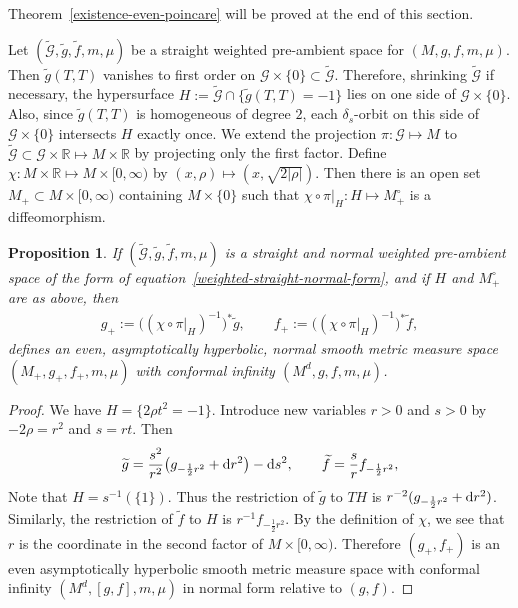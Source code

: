 \documentclass[10pt,a4paper]{amsart}
\newcommand{\mG}{\mathcal{G}}
\numberwithin{equation}{section}
\newtheorem{Proposition}[Theorem]{Proposition}
 { \theoremstyle{definition}
\newtheorem{Definition}[Theorem]{Definition}
\newtheorem{Note}[Theorem]{Note}
\newtheorem{Example}[Theorem]{Example}
\newtheorem{Remark}[Theorem]{Remark} }
\begin{document}
Theorem~\ref{existence-even-poincare} will be proved at the end of this section.

Let $(\widetilde{\mG},\widetilde{g},\widetilde{f},m,\mu)$ be a straight weighted pre-ambient space for $(M,g,f,m,\mu)$. Then $\widetilde{g}(T,T)$ vanishes to first order on $\mG\times \{0\}\subset \widetilde{\mG}$. Therefore, shrinking $\widetilde{\mG}$ if necessary, the hypersurface $H:=\widetilde{\mG}\cap \{\widetilde{g}(T,T)=-1\}$ lies on one side of $\mG\times \{0\}$. Also, since $\widetilde{g}(T,T)$ is homogeneous of degree $2$, each $\delta_s$-orbit on this side of $\mathcal{G}\times \{0\}$ intersects $H$ exactly once. We extend the projection $\pi\colon \mG\mapsto M$ to $\widetilde{\mG}\subset \mG\times \mathbb{R}\mapsto M\times \mathbb{R}$ by projecting only the first factor. Define $\chi\colon M\times \mathbb{R}\mapsto M\times [0,\infty)$ by $(x,\rho)\mapsto (x,\sqrt{2|\rho|})$. Then there is an open set $M_+\subset M\times [0,\infty)$ containing $M\times \{0\}$ such that $\chi\circ \pi|_{H}\colon H\mapsto M_+^{\circ}$ is a diffeomorphism.

\begin{Proposition}
\label{straight-poincare-existence}
If $(\widetilde{\mathcal{G}},\widetilde{g},\widetilde{f},m,\mu)$ is a straight and normal weighted pre-ambient space of the form of equation~\eqref{weighted-straight-normal-form}, and if $H$ and $M_+^{\circ}$ are as above, then
\begin{gather*}
g_+:= \big((\chi\circ \pi|_{H})^{-1}\big)^* \widetilde{g},\qquad
f_+:= \big((\chi\circ \pi|_{H})^{-1}\big)^* \widetilde{f},
\end{gather*}
defines an even, asymptotically hyperbolic, normal smooth metric measure space $(M_+,g_+,f_+,\allowbreak m,\mu)$ with conformal infinity $(M^d,g,f,m,\mu)$.
\end{Proposition}

\begin{proof}
We have $H=\{2\rho t^2=-1\}$. Introduce new variables $r>0$ and $s>0$ by $-2\rho=r^2$ and $s=rt$. Then
\begin{gather*}
\widetilde{g}= \frac{s^2}{r^2}\big(g_{-\frac{1}{2}r^2}+{\rm d}r^2\big)-{\rm d}s^2,
\qquad
\widetilde{f}= \frac{s}{r}f_{-\frac{1}{2}r^2},
\end{gather*}
Note that $H=s^{-1}(\{1\})$. Thus the restriction of $\widetilde{g}$ to $TH$ is $r^{-2}(g_{-\frac{1}{2}r^2}+{\rm d}r^2)$. Similarly, the restriction of $\widetilde{f}$ to $H$ is $r^{-1}f_{-\frac{1}{2}r^2}$. By the definition of $\chi$, we see that $r$ is the coordinate in the second factor of $M\times [0,\infty)$. Therefore $(g_+,f_+)$ is an even asymptotically hyperbolic smooth metric measure space with conformal infinity $(M^d,[g,f],m,\mu)$ in normal form relative to $(g,f)$.
\end{proof}
\end{document}

